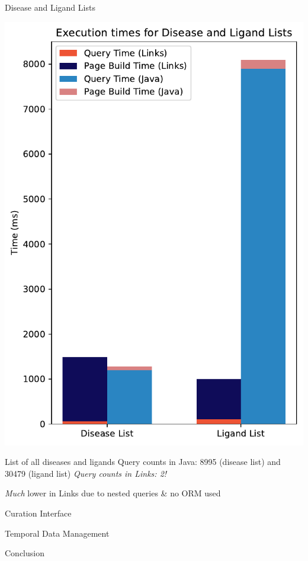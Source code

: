 \documentclass[11.5pt, aspectratio=169]{beamer}
\begin{document}
\begin{frame}{Disease and Ligand Lists}

  \centering
  \includegraphics[scale=0.3]{images/diseaselist_stacked.pdf}
  \vspace{1em}

  \begin{fullpageitemize}
  \itemR List of all diseases and ligands
  \itemR Query counts in Java: 8995 (disease list) and 30479 (ligand list)
  \itemR \emph{Query counts in Links: 2!}
    \begin{itemize}
      \itemR \emph{Much} lower in Links due to nested queries \& no ORM used
    \end{itemize}
  \end{fullpageitemize}

\end{frame}



\begin{frame}{Curation Interface}
\end{frame}

\begin{frame}{Temporal Data Management}
\end{frame}

\begin{frame}{Conclusion}
\end{frame}
\end{document}
